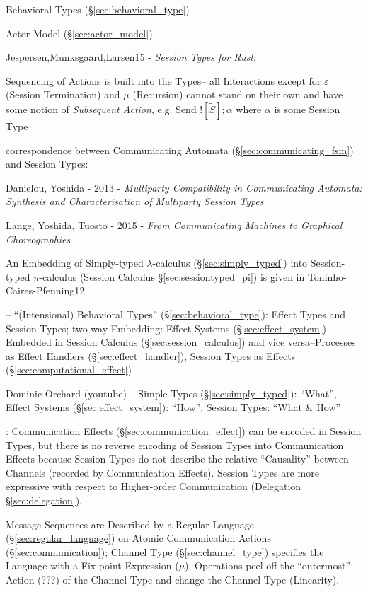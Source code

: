 Behavioral Types (\S\ref{sec:behavioral_type})

\fist Actor Model (\S\ref{sec:actor_model})

Jespersen,Munksgaard,Larsen15 - \emph{Session Types for Rust}:

Sequencing of Actions is built into the Types-- all Interactions except for
$\varepsilon$ (Session Termination) and $\mu$ (Recursion) cannot stand on their
own and have some notion of \emph{Subsequent Action}, e.g. Send
$![\tilde{S}];\alpha$ where $\alpha$ is some Session Type

\asterism


correspondence between Communicating Automata
(\S\ref{sec:communicating_fsm}) and Session Types:

Danielou, Yoshida - 2013 - \emph{Multiparty Compatibility in
  Communicating Automata: Synthesis and Characterisation of Multiparty
  Session Types}

Lange, Yoshida, Tuosto - 2015 -
\emph{From Communicating Machines to Graphical Choreographies}


\asterism


An Embedding of Simply-typed $\lambda$-calculus
(\S\ref{sec:simply_typed}) into Session-typed $\pi$-calculus (Session
Calculus \S\ref{sec:sessiontyped_pi}) is given in
Toninho-Caires-Pfenning12 \cite{caires-pfenning-toninho12}

\cite{orchard-yoshida16} -- ``(Intensional) Behavioral Types''
(\S\ref{sec:behavioral_type}): Effect Types and Session Types; two-way
Embedding: Effect Systems (\S\ref{sec:effect_system}) Embedded in
Session Calculus (\S\ref{sec:session_calculus}) and vice
versa--Processes as Effect Handlers (\S\ref{sec:effect_handler}),
Session Types as Effects (\S\ref{sec:computational_effect})

Dominic Orchard (youtube) -- Simple Types (\S\ref{sec:simply_typed}):
``What'', Effect Systems (\S\ref{sec:effect_system}): ``How'', Session
Types: ``What \& How''

\cite{orchard-yoshida16}: Communication Effects
(\S\ref{sec:communication_effect}) can be encoded in Session Types,
but there is no reverse encoding of Session Types into Communication
Effects because Session Types do not describe the relative
``Causality'' between Channels (recorded by Communication Effects).
Session Types are more expressive with respect to Higher-order
Communication (Delegation \S\ref{sec:delegation}).

Message Sequences are Described by a Regular Language
(\S\ref{sec:regular_language}) on Atomic Communication Actions
(\S\ref{sec:communication}); Channel Type (\S\ref{sec:channel_type})
specifies the Language with a Fix-point Expression ($\mu$). Operations
peel off the ``outermost'' Action (???) of the Channel Type and change
the Channel Type (Linearity). \cite{neubauer-thiemann04}


